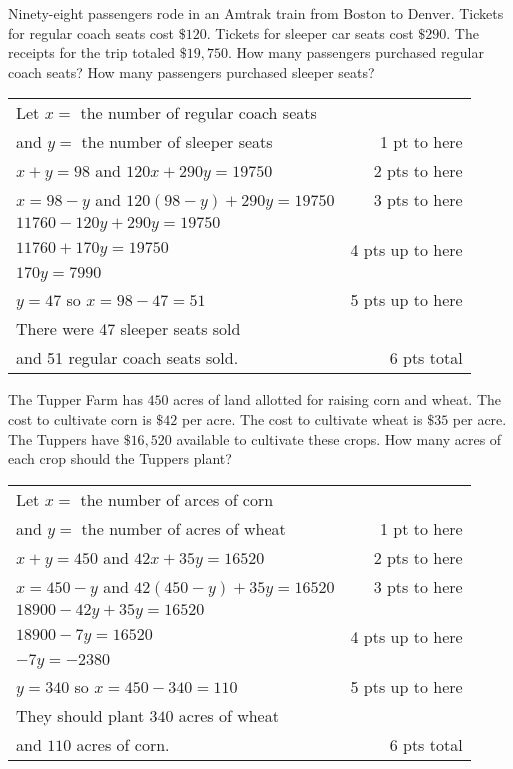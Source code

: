{
	Ninety-eight passengers rode in an Amtrak train from Boston to Denver. Tickets for regular coach seats cost $\$120$. Tickets for sleeper car seats cost $\$290$. The receipts for the trip totaled $\$19,750$. How many passengers purchased regular coach seats? How many passengers purchased sleeper seats?
}
{
	\begin{tabular}{l r}
	Let $x =$ the number of regular coach seats\\ 
	and $y =$ the number of sleeper seats & 1 pt to here\\
	$x + y = 98$     and   $120x + 290y = 19750$ & 2 pts to here\\
	$x = 98 - y$ and    $120(98 - y) +290y =19750$ & 3 pts to here\\
	$11760 - 120y + 290y = 19750$\\
	$11760 + 170y  = 19750$ & 4 pts up to here\\
	$170y  = 7990$\\
	$y = 47$ so $x =98-47=51$ & 5 pts up to here \\
	There were 47 sleeper seats sold \\and 51 regular coach seats sold.  & 6 pts total\\
	\end{tabular}
}

{
	The Tupper Farm has $450$ acres of land allotted for raising corn and wheat. The cost to cultivate corn is $\$42$ per acre. The cost to cultivate wheat is $\$35$ per acre. The Tuppers have $\$16,520$ available to cultivate these crops. How many acres of each crop should the Tuppers plant?
}
{
	\begin{tabular}{l r}
	Let $x =$ the number of arces of corn\\ 
	and $y =$ the number of acres of wheat & 1 pt to here\\
	$x + y = 450$     and   $42x + 35y = 16520$ & 2 pts to here\\
	$x = 450 - y$ and    $42(450 - y) +35y =16520$ & 3 pts to here\\
	$18900 - 42y + 35y = 16520$\\
	$18900-7y  = 16520$ & 4 pts up to here\\
	$-7y  = -2380$\\
	$y = 340$ so $x =450-340=110$ & 5 pts up to here \\
	They should plant $340$ acres of wheat \\and $110$ acres of corn.  & 6 pts total\\
	\end{tabular}
}
